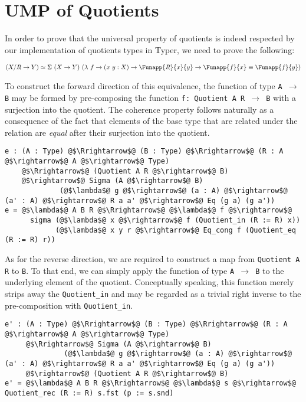 \documentclass[12pt,twoside,maitrise]{dms}
\theoremstyle{definition}
\numberwithin{equation}{section}
\numberwithin{table}{chapter}
\numberwithin{figure}{chapter}
\newcommand\id[1] {\texttt{#1}}
\newcommand\fn[1] {\texttt{#1}}
\begin{document}
\section{UMP of Quotients}\label{app:ump-quot}

In order to prove that the universal property of quotients is indeed respected by our
implementation of quotients types in Typer, we need to prove the following:

\begin{align*}
  & (X/R \rightarrow Y) \simeq \Sigma \ (X \rightarrow Y) \ (\lambda \ f \rightarrow (x \ y : X) \rightarrow \Funapp{R}{x}{y} \rightarrow \Funapp{f}{x} \equiv \Funapp{f}{y}) \\
\end{align*}

To construct the forward direction of this equivalence, the function of type
\fn{A $\rightarrow$ B} may be formed by pre-composing the function \fn{f:
  Quotient A R $\rightarrow$ B} with a surjection into the quotient. The
coherence property follows naturally as a consequence of the fact that elements
of the base type that are related under the relation are \emph{equal} after
their surjection into the quotient.

\begin{verbatim}
e : (A : Type) @$\Rrightarrow$@ (B : Type) @$\Rrightarrow$@ (R : A @$\rightarrow$@ A @$\rightarrow$@ Type)
    @$\Rrightarrow$@ (Quotient A R @$\rightarrow$@ B)
    @$\rightarrow$@ Sigma (A @$\rightarrow$@ B)
             (@$\lambda$@ g @$\rightarrow$@ (a : A) @$\rightarrow$@ (a' : A) @$\rightarrow$@ R a a' @$\rightarrow$@ Eq (g a) (g a'))
e = @$\lambda$@ A B R @$\Rrightarrow$@ @$\lambda$@ f @$\rightarrow$@
      sigma (@$\lambda$@ x @$\rightarrow$@ f (Quotient_in (R := R) x))
            (@$\lambda$@ x y r @$\rightarrow$@ Eq_cong f (Quotient_eq (R := R) r))
\end{verbatim}

As for the reverse direction, we are required to construct a map from
\fn{Quotient A R} to \id{B}. To that end, we can simply apply the function of
type \fn{A $\rightarrow$ B} to the underlying element of the quotient.
Conceptually speaking, this function merely strips away the \id{Quotient\_in}
and may be regarded as a trivial right inverse to the pre-composition with
\id{Quotient\_in}.

\begin{verbatim}
e' : (A : Type) @$\Rrightarrow$@ (B : Type) @$\Rrightarrow$@ (R : A @$\rightarrow$@ A @$\rightarrow$@ Type)
     @$\Rrightarrow$@ Sigma (A @$\rightarrow$@ B)
              (@$\lambda$@ g @$\rightarrow$@ (a : A) @$\rightarrow$@ (a' : A) @$\rightarrow$@ R a a' @$\rightarrow$@ Eq (g a) (g a'))
     @$\rightarrow$@ (Quotient A R @$\rightarrow$@ B)
e' = @$\lambda$@ A B R @$\Rrightarrow$@ @$\lambda$@ s @$\rightarrow$@ Quotient_rec (R := R) s.fst (p := s.snd)
\end{verbatim}
\end{document}
